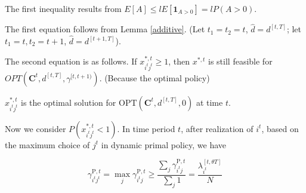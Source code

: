 The first inequality results from $E[A] \leq l E[\bm{1}_{A>0}] = l P(A>0)$.

The first equation follows from Lemma \ref{additive}. (Let $t_1 = t_2 = t$, $\hat{d} = d^{[t, T]}$; let $t_1 = t, t_2 = t+1$, $\hat{d} = d^{[t+1, T]}$).

The second equation is as follows. If $x_{i^{t}j^{t}}^{*,t} \geq 1$, then $x^{*,t}$ is still feasible for $OPT(\bm{C}^{t}, d^{[t, T]}, \gamma^{[t,t+1)})$. (Because the optimal policy)

$x_{i^{t}j^{t}}^{*,t}$ is the optimal solution for $\text{OPT}(\bm{C}^{t}, d^{[t, T]}, 0)$ at time $t$.

Now we consider $P(x_{i^{t}j^{t}}^{*,t} <1)$. In time period $t$, after realization of $i^{t}$, based on the maximum choice of $j^{t}$ in dynamic primal policy, we have

$$
\gamma_{i^t j^t}^{\mathrm{P}, t}=\max_{j} \gamma_{i^t j}^{\mathrm{P}, t} \geqslant \frac{\sum_{j} \gamma_{i^t j}^{\mathrm{P}, t}}{\sum_{j} 1} = \frac{\lambda_{i^t}^{[t, \theta T]}}{N}
$$


